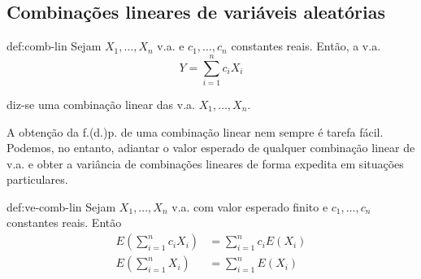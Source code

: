 \newpage
\subsection[3.3 Combinações lineares de variáveis aleatórias]{\hspace*{0.075 em}\raisebox{0.2 em}{$\pmb{\drsh}$} Combinações lineares de variáveis aleatórias}

\begin{theo}{def:comb-lin}\label{def:comb-lin}
    \noindent Sejam $X_1, \dots, X_n$ v.a. e $c_1, \dots, c_n$ constantes reais. Então, a v.a.
    $$
        Y = \sum_{i = 1}^{n} c_i X_i
    $$

    \noindent diz-se uma combinação linear das v.a. $X_1, \dots, X_n$.
\end{theo}

\noindent A obtenção da f.(d.)p. de uma combinação linear nem sempre é tarefa fácil. Podemos, no entanto, adiantar o valor esperado de qualquer combinação linear de v.a. e obter a variância de combinações lineares de forma expedita em situações particulares.

\begin{theo}{def:ve-comb-lin}\label{def:ve-comb-lin}
    \noindent Sejam $X_1, \dots, X_n$ v.a. com valor esperado finito e $c_1, \dots, c_n$ constantes reais. Então
    $$
        \begin{aligned}
            E\left(\sum_{i = 1}^n c_i X_i\right) &= \sum_{i = 1}^n c_i E(X_i)\\[4pt]
            E\left(\sum_{i = 1}^n X_i\right) &= \sum_{i = 1}^n E(X_i)
        \end{aligned}
    $$ %
\end{theo}

